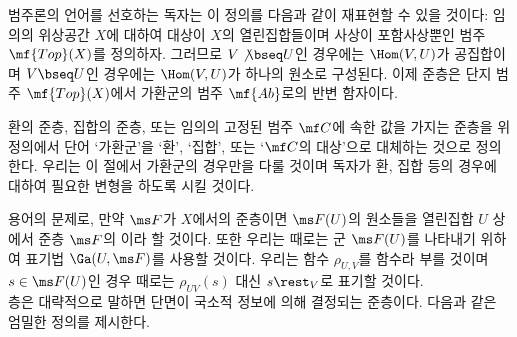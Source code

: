 	
	\begin{definition}
	\end{definition}
	
	범주론의 언어를 선호하는 독자는 이 정의를 다음과 같이 재표현할 수 있을 것이다:
	임의의 위상공간 $X$에 대하여 대상이 $X$의 열린집합들이며 사상이 포함사상뿐인 범주 $\mf{Top}(X)$를 정의하자.
	그러므로 $V\not\bseq U$인 경우에는 $\Hom(V,U)$가 공집합이며 $V\bseq U$인 경우에는 $\Hom(V,U)$가 하나의 원소로 구성된다.
	이제 준층은 단지 범주 $\mf{Top}(X)$에서 가환군의 범주 $\mf{Ab}$로의 반변 함자이다.
	
	환의 준층, 집합의 준층, 또는 임의의 고정된 범주 $\mf C$에 속한 값을 가지는 준층을 위 정의에서 단어 `가환군'을
	`환', `집합', 또는 `$\mf C$의 대상'으로 대체하는 것으로 정의한다.
	우리는 이 절에서 가환군의 경우만을 다룰 것이며 독자가 환, 집합 등의 경우에 대하여 필요한 변형을 하도록 시킬 것이다.
	
	용어의 문제로, 만약 $\ms F$가 $X$에서의 준층이면 $\ms F(U)$의 원소들을
	열린집합 $U$ 상에서 준층 $\ms F$의 이라 할 것이다.
	또한 우리는 때로는 군 $\ms F(U)$를 나타내기 위하여 표기법 $\Ga(U,\ms F)$를 사용할 것이다.
	우리는 함수 $\rho_{U,V}$를 함수라 부를 것이며
	$s\in\ms F(U)$인 경우 때로는 $\rho_{UV}(s)$ 대신 $s\rest_V$로 표기할 것이다.\\
	
	층은 대략적으로 말하면 단면이 국소적 정보에 의해 결정되는 준층이다. 다음과 같은 엄밀한 정의를 제시한다.
	
